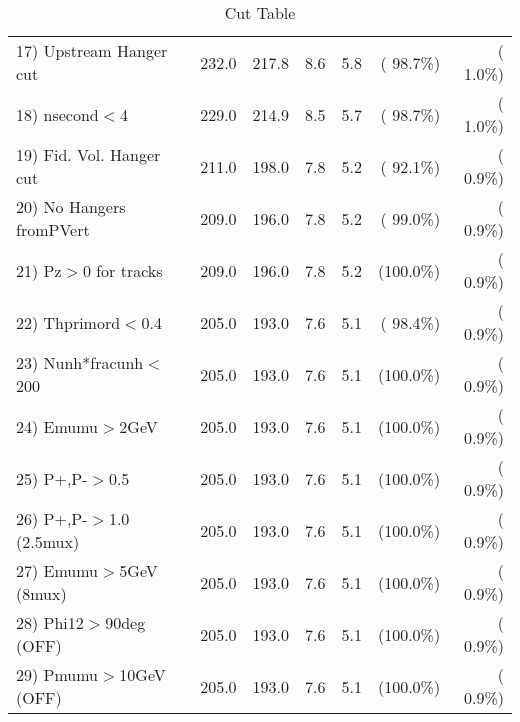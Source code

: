 \begin{table}[h!]
\begin{tabular}{||l||r|r|r|r|r|r||}
 17) Upstream Hanger cut  &        232.0 &        217.8 &          8.6 &          5.8 & ( 98.7\%) & (  1.0\%) \\
 18) nsecond$<$4          &        229.0 &        214.9 &          8.5 &          5.7 & ( 98.7\%) & (  1.0\%) \\
 19) Fid. Vol. Hanger cut &        211.0 &        198.0 &          7.8 &          5.2 & ( 92.1\%) & (  0.9\%) \\
 20) No Hangers fromPVert &        209.0 &        196.0 &          7.8 &          5.2 & ( 99.0\%) & (  0.9\%) \\
 21) Pz$>$0 for tracks    &        209.0 &        196.0 &          7.8 &          5.2 & (100.0\%) & (  0.9\%) \\
 22) Thprimord$<$0.4      &        205.0 &        193.0 &          7.6 &          5.1 & ( 98.4\%) & (  0.9\%) \\
 23) Nunh*fracunh$<$200   &        205.0 &        193.0 &          7.6 &          5.1 & (100.0\%) & (  0.9\%) \\
 24) Emumu$>$2GeV         &        205.0 &        193.0 &          7.6 &          5.1 & (100.0\%) & (  0.9\%) \\
 25) P+,P-$>$0.5          &        205.0 &        193.0 &          7.6 &          5.1 & (100.0\%) & (  0.9\%) \\
 26) P+,P-$>$1.0 (2.5mux) &        205.0 &        193.0 &          7.6 &          5.1 & (100.0\%) & (  0.9\%) \\
 27) Emumu$>$5GeV  (8mux) &        205.0 &        193.0 &          7.6 &          5.1 & (100.0\%) & (  0.9\%) \\
 28) Phi12$>$90deg  (OFF) &        205.0 &        193.0 &          7.6 &          5.1 & (100.0\%) & (  0.9\%) \\
 29) Pmumu$>$10GeV  (OFF) &        205.0 &        193.0 &          7.6 &          5.1 & (100.0\%) & (  0.9\%) \\
 \hline
 \hline
 \end{tabular}
 \caption{Cut Table           }
 \label{tab-cutcohjpsi-mumu_cohrho0}
 \end{table}
